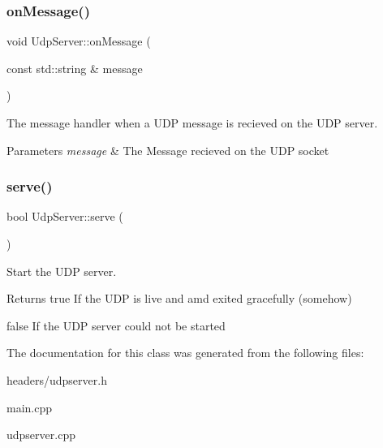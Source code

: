 \subsubsection{on\+Message()}
{\footnotesize\ttfamily void Udp\+Server\+::on\+Message (\begin{DoxyParamCaption}\item[{const std\+::string \&}]{message }\end{DoxyParamCaption})}



The message handler when a U\+DP message is recieved on the U\+DP server. 


\begin{DoxyParams}{Parameters}
{\em message} & The Message recieved on the U\+DP socket \\
\hline
\end{DoxyParams}
\mbox{\label{class_udp_server_a44bb69c6b92e55c2a667514b33782aef}} 
\subsubsection{serve()}
{\footnotesize\ttfamily bool Udp\+Server\+::serve (\begin{DoxyParamCaption}{ }\end{DoxyParamCaption})}



Start the U\+DP server. 

\begin{DoxyReturn}{Returns}
true If the U\+DP is live and amd exited gracefully (somehow) 

false If the U\+DP server could not be started 
\end{DoxyReturn}


The documentation for this class was generated from the following files\+:\begin{DoxyCompactItemize}
\item 
headers/udpserver.\+h\item 
main.\+cpp\item 
udpserver.\+cpp\end{DoxyCompactItemize}
